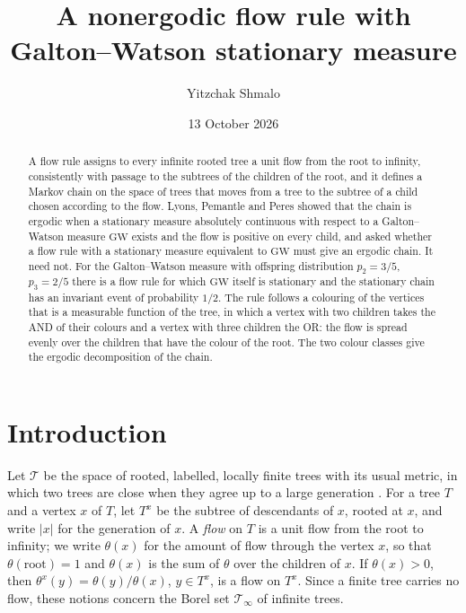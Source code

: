 \documentclass[11pt]{amsart}
\title[A nonergodic flow rule]{A nonergodic flow rule with Galton--Watson stationary measure}
\author{Yitzchak Shmalo}
\date{13 October 2026}
\theoremstyle{remark}
\numberwithin{equation}{section}
\newcommand{\T}{\mathcal T}
\newcommand{\GW}{\mathrm{GW}}
\begin{document}
\begin{abstract}
A flow rule assigns to every infinite rooted tree a unit flow from the root to infinity, consistently with passage to the subtrees of the children of the root, and it defines a Markov chain on the space of trees that moves from a tree to the subtree of a child chosen according to the flow. Lyons, Pemantle and Peres showed that the chain is ergodic when a stationary measure absolutely continuous with respect to a Galton--Watson measure $\GW$ exists and the flow is positive on every child, and asked whether a flow rule with a stationary measure equivalent to $\GW$ must give an ergodic chain. It need not. For the Galton--Watson measure with offspring distribution $p_2=3/5$, $p_3=2/5$ there is a flow rule for which $\GW$ itself is stationary and the stationary chain has an invariant event of probability $1/2$. The rule follows a colouring of the vertices that is a measurable function of the tree, in which a vertex with two children takes the AND of their colours and a vertex with three children the OR: the flow is spread evenly over the children that have the colour of the root. The two colour classes give the ergodic decomposition of the chain.
\end{abstract}
\maketitle

\section{Introduction}

Let $\T$ be the space of rooted, labelled, locally finite trees with its usual metric, in which two trees are close when they agree up to a large generation \cite[Exercise~5.2]{LP}. For a tree $T$ and a vertex $x$ of $T$, let $T^x$ be the subtree of descendants of $x$, rooted at $x$, and write $|x|$ for the generation of $x$. A \emph{flow} on $T$ is a unit flow from the root to infinity; we write $\theta(x)$ for the amount of flow through the vertex $x$, so that $\theta(\text{root})=1$ and $\theta(x)$ is the sum of $\theta$ over the children of $x$. If $\theta(x)>0$, then $\theta^x(y)=\theta(y)/\theta(x)$, $y\in T^x$, is a flow on $T^x$. Since a finite tree carries no flow, these notions concern the Borel set $\T_\infty$ of infinite trees.
\end{document}
